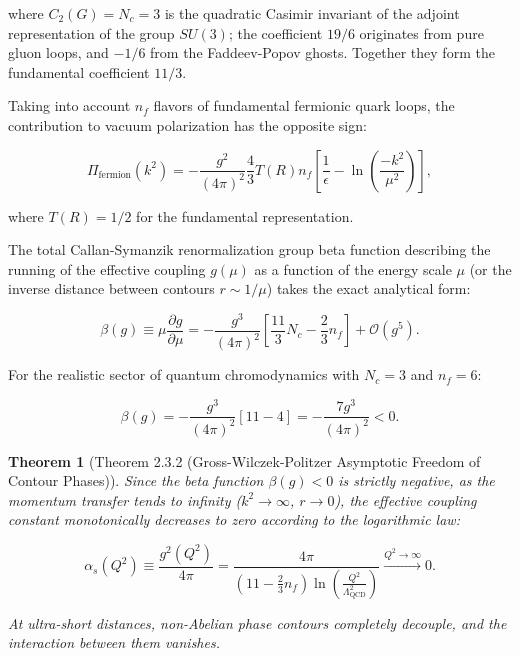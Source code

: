 \documentclass[11pt,a4paper]{article}
\newtheorem{theorem}{Theorem}[section]
\theoremstyle{definition}
\begin{document}
where $C_2(G) = N_c = 3$ is the quadratic Casimir invariant of the adjoint representation of the group $SU(3)$; the coefficient $19/6$ originates from pure gluon loops, and $-1/6$ from the Faddeev-Popov ghosts. Together they form the fundamental coefficient $11/3$.

Taking into account $n_f$ flavors of fundamental fermionic quark loops, the contribution to vacuum polarization has the opposite sign:

\begin{equation}\label{eq:2.3.24}\tag{2.3.24}
\Pi_{\text{fermion}}(k^2) = - \frac{g^2}{(4\pi)^2} \frac{4}{3} T(R) n_f \left[ \frac{1}{\epsilon} - \ln\left( \frac{-k^2}{\mu^2} \right) \right],
\end{equation}

where $T(R) = 1/2$ for the fundamental representation.

The total Callan-Symanzik renormalization group beta function describing the running of the effective coupling $g(\mu)$ as a function of the energy scale $\mu$ (or the inverse distance between contours $r \sim 1/\mu$) takes the exact analytical form:

\begin{equation}\label{eq:2.3.25}\tag{2.3.25}
\beta(g) \equiv \mu \frac{\partial g}{\partial \mu} = - \frac{g^3}{(4\pi)^2} \left[ \frac{11}{3} N_c - \frac{2}{3} n_f \right] + \mathcal{O}(g^5).
\end{equation}

For the realistic sector of quantum chromodynamics with $N_c = 3$ and $n_f = 6$:

\begin{equation}\label{eq:2.3.26}\tag{2.3.26}
\beta(g) = - \frac{g^3}{(4\pi)^2} \left[ 11 - 4 \right] = - \frac{7 g^3}{(4\pi)^2} < 0.
\end{equation}

\begin{theorem}[Theorem 2.3.2 (Gross-Wilczek-Politzer Asymptotic Freedom of Contour Phases)]\label{thm:2.3.2}
Since the beta function $\beta(g) < 0$ is strictly negative, as the momentum transfer tends to infinity ($k^2 \to \infty$, $r \to 0$), the effective coupling constant monotonically decreases to zero according to the logarithmic law:

\begin{equation}\label{eq:2.3.27}\tag{2.3.27}
\alpha_s(Q^2) \equiv \frac{g^2(Q^2)}{4\pi} = \frac{4\pi}{\left( 11 - \frac{2}{3}n_f \right) \ln\left( \frac{Q^2}{\Lambda_{\text{QCD}}^2} \right)} \xrightarrow{Q^2 \to \infty} 0.
\end{equation}

At ultra-short distances, non-Abelian phase contours completely decouple, and the interaction between them vanishes.
\end{theorem}
\end{document}
